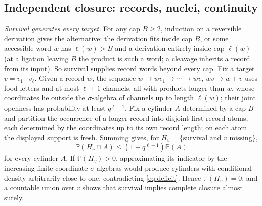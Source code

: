 \documentclass[11pt,letterpaper]{article}
\theoremstyle{plain}
\theoremstyle{definition}
\theoremstyle{remark}
\numberwithin{equation}{section}
\newcommand{\PP}{\mathbb P}
\begin{document}
\subsection{Independent closure: records, nuclei, continuity}\label{app:iid}
\emph{Survival generates every target.} For any cap $B\ge2$, induction on a reversible derivation gives the alternative: the derivation fits inside cap $B$, or some accessible word $w$ has $\ell(w)>B$ and a derivation entirely inside cap $\ell(w)$ (at a ligation leaving $B$ the product is such a word; a cleavage inherits a record from its input). So survival supplies record words beyond every cap. Fix a target $v=v_1\cdots v_\ell$. Given a record $w$, the sequence $w\to wv_1\to\cdots\to wv$, $wv\to w+v$ uses food letters and at most $\ell+1$ channels, all with products longer than $w$, whose coordinates lie outside the $\sigma$-algebra of channels up to length $\ell(w)$; their joint openness has probability at least $q^{\ell+1}$. Fix a cylinder $A$ determined by a cap $B$ and partition the occurrence of a longer record into disjoint first-record atoms, each determined by the coordinates up to its own record length; on each atom the displayed support is fresh. Summing gives, for $H_v=\{\text{survival and }v\text{ missing}\}$,
\begin{equation}\label{eq:deficit}
 \PP(H_v\cap A)\le(1-q^{\ell+1})\PP(A)
\end{equation}
for every cylinder $A$. If $\PP(H_v)>0$, approximating its indicator by the increasing finite-coordinate $\sigma$-algebras would produce cylinders with conditional density arbitrarily close to one, contradicting \eqref{eq:deficit}. Hence $\PP(H_v)=0$, and a countable union over $v$ shows that survival implies complete closure almost surely.
\end{document}
